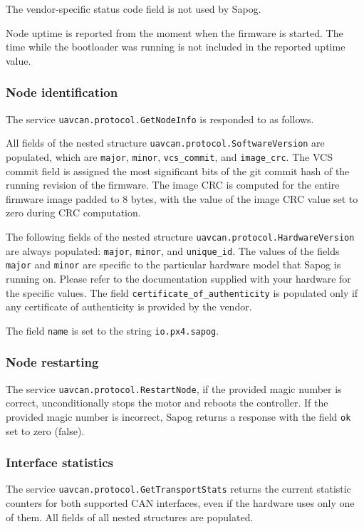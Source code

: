 \documentclass{zubaxdoc}
\begin{document}
The vendor-specific status code field is not used by Sapog.

Node uptime is reported from the moment when the firmware is started.
The time while the bootloader was running is not included in the reported uptime value.

\subsubsection{Node identification}

The service \verb|uavcan.protocol.GetNodeInfo| is responded to as follows.

All fields of the nested structure \verb|uavcan.protocol.SoftwareVersion|
are populated, which are \verb|major|, \verb|minor|, \verb|vcs_commit|, and \verb|image_crc|.
The VCS commit field is assigned the most significant bits of the git commit hash
of the running revision of the firmware.
The image CRC is computed for the entire firmware image padded to 8 bytes,
with the value of the image CRC value set to zero during CRC computation.

The following fields of the nested structure \verb|uavcan.protocol.HardwareVersion|
are always populated: \verb|major|, \verb|minor|, and \verb|unique_id|.
The values of the fields \verb|major| and \verb|minor| are specific
to the particular hardware model that Sapog is running on.
Please refer to the documentation supplied with your hardware for the specific values.
The field \verb|certificate_of_authenticity| is populated only if any certificate of authenticity
is provided by the vendor.

The field \verb|name| is set to the string \verb|io.px4.sapog|.

\subsubsection{Node restarting}

The service \verb|uavcan.protocol.RestartNode|, if the provided magic number is correct,
unconditionally stops the motor and reboots the controller.
If the provided magic number is incorrect, Sapog returns a response with the field \verb|ok|
set to zero (false).

\subsubsection{Interface statistics}

The service \verb|uavcan.protocol.GetTransportStats| returns the current statistic counters
for both supported CAN interfaces, even if the hardware uses only one of them.
All fields of all nested structures are populated.
\end{document}
